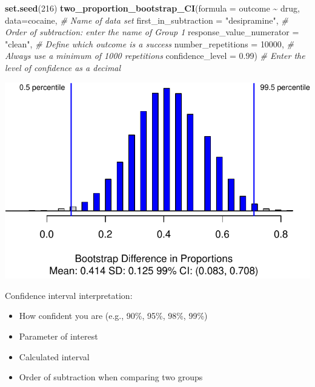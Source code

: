 \documentclass[
]{report}
\newenvironment{Shaded}{\begin{snugshade}}{\end{snugshade}}
\newcommand{\AttributeTok}[1]{\textcolor[rgb]{0.13,0.29,0.53}{#1}}
\newcommand{\CommentTok}[1]{\textcolor[rgb]{0.56,0.35,0.01}{\textit{#1}}}
\newcommand{\DecValTok}[1]{\textcolor[rgb]{0.00,0.00,0.81}{#1}}
\newcommand{\FloatTok}[1]{\textcolor[rgb]{0.00,0.00,0.81}{#1}}
\newcommand{\FunctionTok}[1]{\textcolor[rgb]{0.13,0.29,0.53}{\textbf{#1}}}
\newcommand{\NormalTok}[1]{#1}
\newcommand{\SpecialCharTok}[1]{\textcolor[rgb]{0.81,0.36,0.00}{\textbf{#1}}}
\newcommand{\StringTok}[1]{\textcolor[rgb]{0.31,0.60,0.02}{#1}}
\begin{document}
\begin{Shaded}
\begin{Highlighting}[]
\FunctionTok{set.seed}\NormalTok{(}\DecValTok{216}\NormalTok{)}
\FunctionTok{two\_proportion\_bootstrap\_CI}\NormalTok{(}\AttributeTok{formula =}\NormalTok{ outcome }\SpecialCharTok{\textasciitilde{}}\NormalTok{ drug, }
        \AttributeTok{data=}\NormalTok{cocaine, }\CommentTok{\# Name of data set}
        \AttributeTok{first\_in\_subtraction =} \StringTok{"desipramine"}\NormalTok{, }\CommentTok{\# Order of subtraction: enter the name of Group 1}
        \AttributeTok{response\_value\_numerator =} \StringTok{"clean"}\NormalTok{, }\CommentTok{\# Define which outcome is a success }
        \AttributeTok{number\_repetitions =} \DecValTok{10000}\NormalTok{, }\CommentTok{\# Always use a minimum of 1000 repetitions}
        \AttributeTok{confidence\_level =} \FloatTok{0.99}\NormalTok{) }\CommentTok{\# Enter the level of confidence as a decimal}
\end{Highlighting}
\end{Shaded}

\begin{center}\includegraphics[width=0.7\linewidth]{08-VN08-two-cat-simulation_files/figure-latex/unnamed-chunk-15-1} \end{center}

Confidence interval interpretation:

\begin{itemize}
\item
  How confident you are (e.g., 90\%, 95\%, 98\%, 99\%)
\item
  Parameter of interest
\item
  Calculated interval
\item
  Order of subtraction when comparing two groups
\end{itemize}

\vspace{0.8in}
\end{document}
